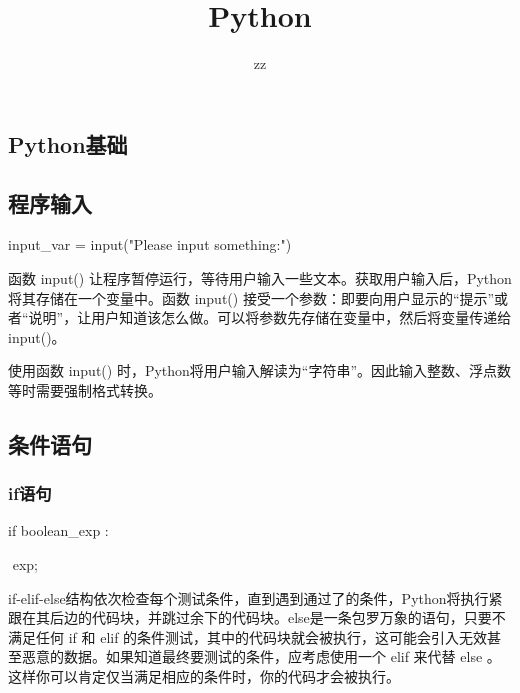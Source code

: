 \documentclass{book}
\title{Python}
\author{zz}
\begin{document}
\maketitle
\pagestyle{empty}
\begin{CJK}{UTF8}{gbsn}
\tableofcontents
\renewcommand\thesection{\arabic{section}} 

\newpage
\section{Python基础}


%
%
%
%
%
%
%


\subsection{程序输入}
input\_var = input("Please input something:")

函数 input() 让程序暂停运行，等待用户输入一些文本。获取用户输入后，Python将其存储在一个变量中。函数 input() 接受一个参数：即要向用户显示的``提示''或者``说明''，让用户知道该怎么做。可以将参数先存储在变量中，然后将变量传递给 input()。

使用函数 input() 时，Python将用户输入解读为``字符串''。因此输入整数、浮点数等时需要强制格式转换。

\subsection{条件语句}

\subsubsection{if语句}
if  boolean\_exp :

​	exp;

​	if-elif-else结构依次检查每个测试条件，直到遇到通过了的条件，Python将执行紧跟在其后边的代码块，并跳过余下的代码块。else是一条包罗万象的语句，只要不满足任何 if 和 elif 的条件测试，其中的代码块就会被执行，这可能会引入无效甚至恶意的数据。如果知道最终要测试的条件，应考虑使用一个 elif 来代替 else 。这样你可以肯定仅当满足相应的条件时，你的代码才会被执行。


\end{CJK}
\end{document}
